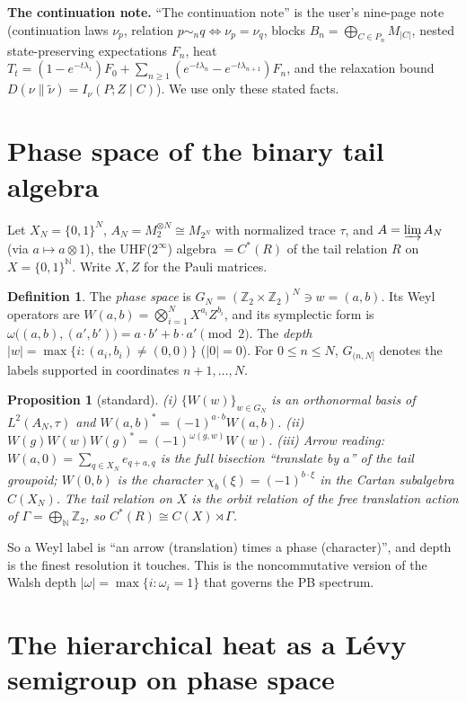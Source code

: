 \documentclass[11pt]{article}
\newtheorem{proposition}[theorem]{Proposition}
\theoremstyle{definition}
\newtheorem{definition}[theorem]{Definition}
\theoremstyle{remark}
\newcommand{\Z}{\mathbb Z}
\newcommand{\N}{\mathbb N}
\newcommand{\dep}[1]{|#1|}
\begin{document}
\textbf{The continuation note.} ``The continuation note'' is the user's nine-page note (continuation laws $\nu_p$, relation $p\sim_n q\iff\nu_p=\nu_q$, blocks $B_n=\bigoplus_{C\in P_n}M_{|C|}$, nested state-preserving expectations $F_n$, heat $T_t=(1-e^{-t\lambda_1})F_0+\sum_{n\ge1}(e^{-t\lambda_n}-e^{-t\lambda_{n+1}})F_n$, and the relaxation bound $D(\nu\|\tilde\nu)=I_\nu(P;Z\mid C)$). We use only these stated facts.

\section{Phase space of the binary tail algebra}\label{sec:phase}

Let $X_N=\{0,1\}^N$, $A_N=M_2^{\otimes N}\cong M_{2^N}$ with normalized trace $\tau$, and $A=\varinjlim A_N$ (via $a\mapsto a\otimes 1$), the UHF($2^\infty$) algebra $=C^*(R)$ of the tail relation $R$ on $X=\{0,1\}^{\N}$. Write $X,Z$ for the Pauli matrices.

\begin{definition}
The \emph{phase space} is $G_N=(\Z_2\times\Z_2)^N\ni w=(a,b)$. Its Weyl operators are $W(a,b)=\bigotimes_{i=1}^N X^{a_i}Z^{b_i}$, and its symplectic form is $\omega\big((a,b),(a',b')\big)=a\cdot b'+b\cdot a'\pmod 2$. The \emph{depth} $\dep w=\max\{i:(a_i,b_i)\neq(0,0)\}$ ($\dep 0=0$). For $0\le n\le N$, $G_{(n,N]}$ denotes the labels supported in coordinates $n+1,\dots,N$.
\end{definition}

\begin{proposition}[standard]\label{prop:weyl}
(i) $\{W(w)\}_{w\in G_N}$ is an orthonormal basis of $L^2(A_N,\tau)$ and $W(a,b)^*=(-1)^{a\cdot b}W(a,b)$. (ii) $W(g)W(w)W(g)^*=(-1)^{\omega(g,w)}W(w)$. (iii) Arrow reading: $W(a,0)=\sum_{q\in X_N}e_{q+a,q}$ is the full bisection ``translate by $a$'' of the tail groupoid; $W(0,b)$ is the character $\chi_b(\xi)=(-1)^{b\cdot\xi}$ in the Cartan subalgebra $C(X_N)$. The tail relation on $X$ is the orbit relation of the free translation action of $\Gamma=\bigoplus_{\N}\Z_2$, so $C^*(R)\cong C(X)\rtimes\Gamma$.
\end{proposition}

So a Weyl label is ``an arrow (translation) times a phase (character)'', and depth is the finest resolution it touches. This is the noncommutative version of the Walsh depth $|\omega|=\max\{i:\omega_i=1\}$ that governs the PB spectrum.

\section{The hierarchical heat as a L\'evy semigroup on phase space}\label{sec:levy}
\end{document}
